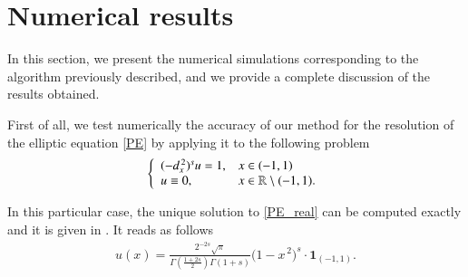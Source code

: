 \section{Numerical results} \label{res_numerical}
In this section, we present the numerical simulations corresponding to the algorithm previously described, and we provide a complete discussion of the results obtained. 

First of all, we test numerically the accuracy of our method for the resolution of the elliptic equation \eqref{PE} by applying it to the following problem 
\begin{align}\label{PE_real}
	\left\{\begin{array}{ll}
		(-d_x^{\,2})^{s}u = 1, & x\in(-1,1)
		\\
		u\equiv 0, & x\in\mathbb{R}\setminus(-1,1).
	\end{array}\right.
\end{align}

In this particular case, the unique solution to \eqref{PE_real} can be computed exactly and it is given in \cite{getoor1961first}. It reads as follows
\begin{align}\label{real_sol}
	u(x)=\frac{2^{-2s}\sqrt{\pi}}{\Gamma\left(\frac{1+2s}{2}\right)\Gamma(1+s)}\Big(1-x^{\,2}\Big)^s\cdot\mathbf{1}_{(-1,1)}.
\end{align}

